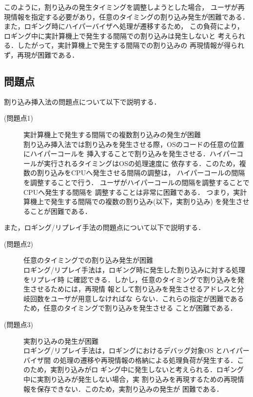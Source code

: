\documentclass[submit,techreq,noauthor,dvipdfmx]{ipsj}
\begin{document}
このように，割り込みの発生タイミングを調整しようとした場合，
ユーザが再現情報を指定する必要があり，任意のタイミングの割り込み発生が困難である．
また，ロギング時にハイパーバイザへ処理が遷移するため，
この負荷により，ロギング中に実計算機上で発生する間隔での割り込みは発生しないと
考えられる．したがって，実計算機上で発生する間隔での割り込みの
再現情報が得られず，再現が困難である．

\subsection{問題点}\label{sec:problem}

割り込み挿入法の問題点について以下で説明する．

\begin{description}
    \item[(問題点1)]実計算機上で発生する間隔での複数割り込みの発生が困難\\
        割り込み挿入法では割り込みを発生させる際，OSのコードの任意の位置にハイパーコールを
        挿入することで割り込みを発生させる．ハイパーコールが実行されるタイミングはOSの処理速度に
        依存する．このため，複数の割り込みをCPUへ発生させる間隔の調整は，
        ハイパーコールの間隔を調整することで行う．
        ユーザがハイパーコールの間隔を調整することでCPUへ発生する間隔を
        調整することは非常に困難である．
        つまり，実計算機上で発生する間隔での複数の割り込み(以下，実割り込み)
        を発生させることが困難である．
\end{description}

また，ロギング/リプレイ手法の問題点について以下で説明する．

\begin{description}
    \item[(問題点2)]任意のタイミングでの割り込み発生が困難\\
        ロギング/リプレイ手法は，ロギング時に発生した割り込みに対する処理をリプレイ時
        に確認できる．しかし，任意のタイミングで割り込みを発生させるためには，再現情
        報として割り込みを発生させるアドレスと分岐回数をユーザが用意しなければな
        らない．これらの指定が困難であるため，任意のタイミングで割り込みを発生させる
        ことが困難である．
    \item[(問題点3)]実割り込みの発生が困難\\
        ロギング/リプレイ手法は，ロギングにおけるデバッグ対象OS とハイパーバイザ間
        の処理の遷移や再現情報の格納による処理負荷が発生する．このため，実割り込みがロ
        ギング中に発生しないと考えられる．ロギング中に実割り込みが発生しない場合，実
        割り込みを再現するための再現情報を保存できない．このため，実割り込みの発生が
        困難である．
\end{description}
\end{document}
